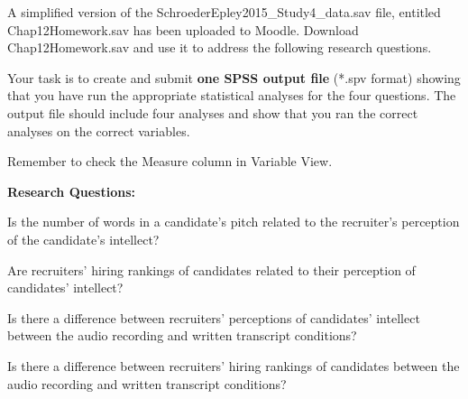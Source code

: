 \documentclass[
]{book}
\begin{document}
A simplified version of the SchroederEpley2015\_Study4\_data.sav file, entitled Chap12Homework.sav has been uploaded to Moodle. Download Chap12Homework.sav and use it to address the following research questions.

Your task is to create and submit \textbf{one SPSS output file} (*.spv format) showing that you have run the appropriate statistical analyses for the four questions. The output file should include four analyses and show that you ran the correct analyses on the correct variables.

Remember to check the {Measure} column in {Variable View}.

\textbf{Research Questions:}

Is the number of words in a candidate's pitch related to the recruiter's perception of the candidate's intellect?

Are recruiters' hiring rankings of candidates related to their perception of candidates' intellect?

Is there a difference between recruiters' perceptions of candidates' intellect between the audio recording and written transcript conditions?

Is there a difference between recruiters' hiring rankings of candidates between the audio recording and written transcript conditions?

  
\end{document}
